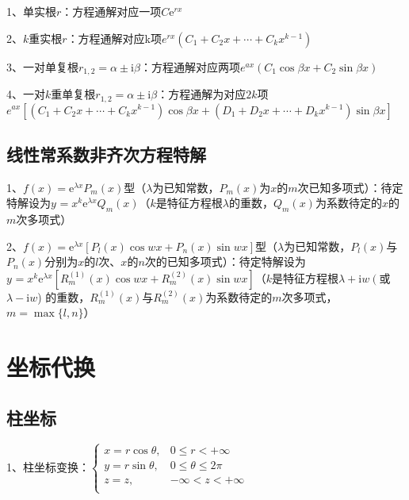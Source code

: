 1、单实根$r$：方程通解对应一项$ C \mathrm{e}^{rx}$

2、$k$重实根$r$：方程通解对应k项${e}^{r x}\left(C_{1}+C_{2} x+\cdots+C_{k} x^{k-1}\right)$

3、一对单复根$r_{1,2}=\alpha \pm \mathrm{i} \beta$：方程通解对应两项${e}^{a x}\left(C_{1} \cos \beta x+C_{2} \sin \beta x\right)$

4、一对$k$重单复根$r_{1,2}=\alpha \pm \mathrm{i} \beta$：方程通解为对应$2k$项${e}^{{ax}}[(C_{1}+C_{2} x+\cdots+C_{k} x^{k-1}) \cos \beta x+(D_{1}+D_{2} x+\cdots+D_{k} x^{k-1}) \sin \beta x]$



\subsection{线性常系数非齐次方程特解}

1、$f(x)=\mathrm{e}^{\lambda x} P_{m}(x)$型（$\lambda$为已知常数，$P_{m}(x)$为$x$的$m$次已知多项式）：待定特解设为$y^{}=x^{k} \mathrm{e}^{\lambda x} Q_{m}(x)$（$k$是特征方程根$\lambda$的重数，$Q_{m}(x)$为系数待定的$x$的$m$次多项式）

2、$f(x)=\mathrm{e}^{\lambda x}\left[P_{l}(x) \cos w x+P_{n}(x) \sin w x\right]$型（$\lambda$为已知常数，$P_{l}(x)$与$P_{n}(x)$分别为$x$的$l$次、$x$的$n$次的已知多项式）：待定特解设为$y^{}=x^{k} \mathrm{e}^{\lambda x}\left[R_{m}^{(1)}(x) \cos w x+R_{m}^{(2)}(x) \sin w x\right]$（$k$是特征方程根$\lambda+\mathrm{i} w\left(\right.$或$\lambda-\mathrm{i} w$) 的重数，$R_{m}^{(1)}(x)$与$R_{m}^{(2)}(x)$为系数待定的$m$次多项式，$m=\max \{l, n\}$）

\section{坐标代换}



\subsection{柱坐标}

1、柱坐标变换：$\begin{cases} x=r \cos \theta, & 0 \leqslant r < +\infty \\ y=r \sin \theta,& 0 \leqslant \theta \leqslant 2 \pi \\ z=z, &  -\infty<z<+\infty \\ \end{cases}$

